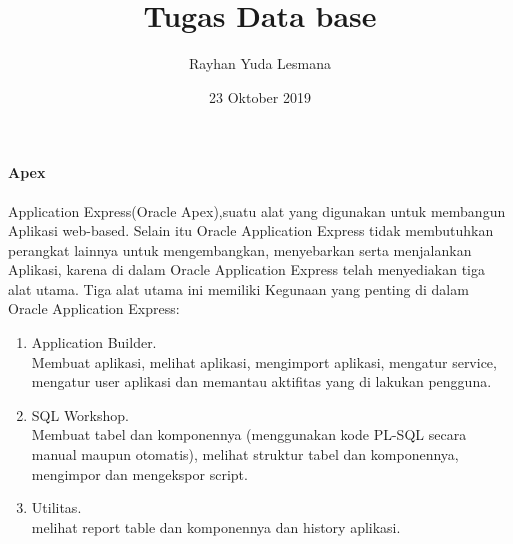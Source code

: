 \documentclass[a4paper,12pt]{report}
\title{Tugas Data base}
\author{Rayhan Yuda Lesmana}
\date{23 Oktober 2019}
\begin{document}
\maketitle
\paragraph{Apex}
Application Express(Oracle Apex),suatu alat yang digunakan untuk membangun Aplikasi web-based. Selain itu Oracle Application Express tidak membutuhkan perangkat lainnya untuk mengembangkan, menyebarkan serta menjalankan Aplikasi, karena di dalam Oracle Application Express telah menyediakan tiga alat utama. Tiga alat utama ini memiliki Kegunaan yang penting di dalam Oracle Application Express:\\
\begin{enumerate}
\item  Application Builder.\\
Membuat aplikasi, melihat aplikasi, mengimport aplikasi, mengatur service, mengatur user aplikasi dan memantau aktifitas yang di lakukan pengguna.\\
\item  SQL Workshop.\\
Membuat tabel dan komponennya (menggunakan kode PL-SQL secara manual maupun otomatis), melihat struktur tabel dan komponennya, mengimpor dan mengekspor script.\\
\item Utilitas.\\
melihat report table dan komponennya dan history aplikasi.\\
\end{enumerate}
\end{document}
